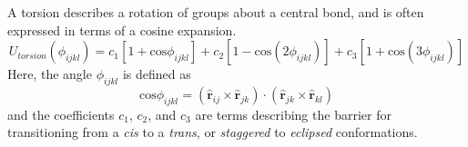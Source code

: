 A torsion describes a rotation of groups about a central bond, and is
often expressed in terms of a cosine expansion.
\begin{equation}\label{eq:torsion}
U_{torsion}(\phi_{ijkl}) = c_1[1+\mathrm{cos}\phi_{ijkl}] + c_2[1-\mathrm{cos}(2\phi_{ijkl})]+c_3[1+\mathrm{cos}(3\phi_{ijkl})]
\end{equation}
Here, the angle $\phi_{ijkl}$ is defined as
\begin{equation}\label{eq:torsion2}
\mathrm{cos}\phi_{ijkl} = (\mathbf{\hat{r}}_{ij} \times
\mathbf{\hat{r}}_{jk}) \cdot (\mathbf{\hat{r}}_{jk} \times
\mathbf{\hat{r}}_{kl})
\end{equation}
and the coefficients $c_1$, $c_2$, and $c_3$ are terms describing the
barrier for transitioning from a \textit{cis} to a \textit{trans}, or \textit{staggered} to
\textit{eclipsed} conformations.

